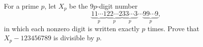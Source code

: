 For a prime $p$, let $X_p$ be the $9p$-digit number
\[
\underbrace{11\cdots1}_{p}\underbrace{22\cdots2}_{p}\underbrace{33\cdots3}_{p}\cdots\underbrace{99\cdots9}_{p},
\]
in which each nonzero digit is written exactly $p$ times. Prove that $X_p-123456789$ is divisible by $p$.
